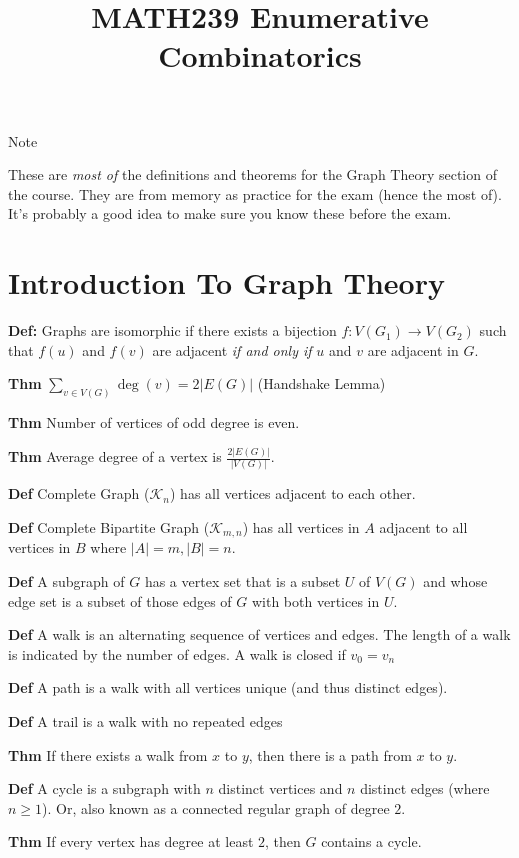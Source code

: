 \documentclass{article}
\title{MATH239 Enumerative Combinatorics}
\begin{document}
\begin{center}
Note
\end{center}

These are \textit{most of} the definitions and theorems for the Graph Theory section of the course. They are from memory as practice for the exam (hence the most of). It's probably a good idea to make sure you know these before the exam.  


\section{Introduction To Graph Theory}

\textbf{Def:} Graphs are isomorphic if there exists a bijection $f: V(G_1) \to V(G_2)$ such that $f(u)$ and $f(v)$ are adjacent \textit{if and only if} $u$ and $v$ are adjacent in $G$. 

\textbf{Thm} $\sum_{v \in V(G)} \deg(v) = 2 |E(G)|$ (Handshake Lemma)

\textbf{Thm} Number of vertices of odd degree is even. 

\textbf{Thm} Average degree of a vertex is $\frac{2|E(G)|}{|V(G)|}$.

\textbf{Def} Complete Graph ($\mathcal{K}_n$) has all vertices adjacent to each other. 

\textbf{Def} Complete Bipartite Graph ($\mathcal{K}_{m,n}$) has all vertices in $A$ adjacent to all vertices in $B$ where $|A| = m, |B| = n$.

\textbf{Def} A subgraph of $G$ has a vertex set that is a subset $U$ of $V(G)$ and whose edge set is a subset of those edges of $G$ with both vertices in $U$. 

\textbf{Def} A walk is an alternating sequence of vertices and edges. The length of a walk is indicated by the number of edges. A walk is closed if $v_0 = v_n$

\textbf{Def} A path is a walk with all vertices unique (and thus distinct edges). 

\textbf{Def} A trail is a walk with no repeated edges 

\textbf{Thm} If there exists a walk from $x$ to $y$, then there is a path from $x$ to $y$. 

\textbf{Def} A cycle is a subgraph with $n$ distinct vertices and $n$ distinct edges (where $n \ge 1$). Or, also known as a connected regular graph of degree $2$. 

\textbf{Thm} If every vertex has degree at least $2$, then $G$ contains a cycle. 
\end{document}

